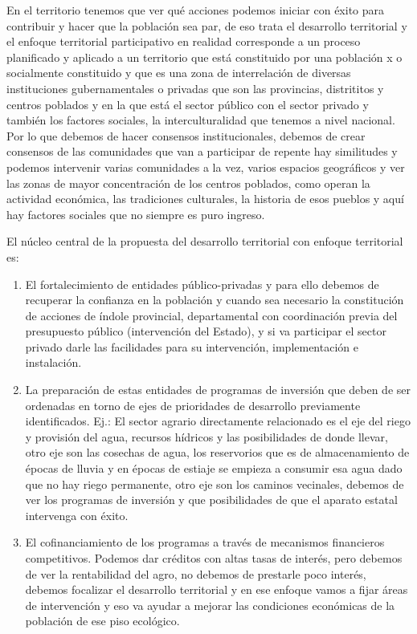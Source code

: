 \documentclass[
  jou,
  floatsintext,
  longtable,
  a4paper,
  nolmodern,
  notxfonts,
  notimes,
  12pt,
  colorlinks=true,linkcolor=blue,citecolor=blue,urlcolor=blue]{apa7}
\providecommand{\tightlist}{%
  \setlength{\itemsep}{0pt}\setlength{\parskip}{0pt}}
\begin{document}
En el territorio tenemos que ver qué acciones podemos iniciar con éxito
para contribuir y hacer que la población sea par, de eso trata el
desarrollo territorial y el enfoque territorial participativo en
realidad corresponde a un proceso planificado y aplicado a un territorio
que está constituido por una población x o socialmente constituido y que
es una zona de interrelación de diversas instituciones gubernamentales o
privadas que son las provincias, distrititos y centros poblados y en la
que está el sector público con el sector privado y también los factores
sociales, la interculturalidad que tenemos a nivel nacional. Por lo que
debemos de hacer consensos institucionales, debemos de crear consensos
de las comunidades que van a participar de repente hay similitudes y
podemos intervenir varias comunidades a la vez, varios espacios
geográficos y ver las zonas de mayor concentración de los centros
poblados, como operan la actividad económica, las tradiciones
culturales, la historia de esos pueblos y aquí hay factores sociales que
no siempre es puro ingreso.

El núcleo central de la propuesta del desarrollo territorial con enfoque
territorial es:

\begin{enumerate}
\def\labelenumi{\arabic{enumi}.}
\tightlist
\item
  El fortalecimiento de entidades público-privadas y para ello debemos
  de recuperar la confianza en la población y cuando sea necesario la
  constitución de acciones de índole provincial, departamental con
  coordinación previa del presupuesto público (intervención del Estado),
  y si va participar el sector privado darle las facilidades para su
  intervención, implementación e instalación.
\item
  La preparación de estas entidades de programas de inversión que deben
  de ser ordenadas en torno de ejes de prioridades de desarrollo
  previamente identificados. Ej.: El sector agrario directamente
  relacionado es el eje del riego y provisión del agua, recursos
  hídricos y las posibilidades de donde llevar, otro eje son las
  cosechas de agua, los reservorios que es de almacenamiento de épocas
  de lluvia y en épocas de estiaje se empieza a consumir esa agua dado
  que no hay riego permanente, otro eje son los caminos vecinales,
  debemos de ver los programas de inversión y que posibilidades de que
  el aparato estatal intervenga con éxito.
\item
  El cofinanciamiento de los programas a través de mecanismos
  financieros competitivos. Podemos dar créditos con altas tasas de
  interés, pero debemos de ver la rentabilidad del agro, no debemos de
  prestarle poco interés, debemos focalizar el desarrollo territorial y
  en ese enfoque vamos a fijar áreas de intervención y eso va ayudar a
  mejorar las condiciones económicas de la población de ese piso
  ecológico.
\end{enumerate}
\end{document}
